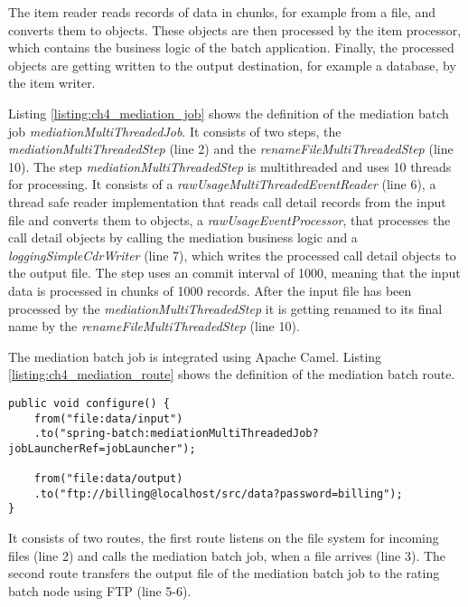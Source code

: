 The item reader reads records of data in chunks, for example from a file, and converts them to objects. These objects are then processed by the item processor, which contains the business logic of the batch application. Finally, the processed objects are getting written to the output destination, for example a database, by the item writer.



Listing \ref{listing:ch4_mediation_job} shows the definition of the mediation batch job \emph{mediationMultiThreadedJob}. It consists of two steps, the \emph{mediationMultiThreadedStep} (line 2) and the \emph{renameFileMultiThreadedStep} (line 10). The step \emph{mediationMultiThreadedStep} is multithreaded and uses 10 threads for processing. It consists of a \emph{rawUsageMultiThreadedEventReader} (line 6), a thread safe reader implementation that reads call detail records from the input file and converts them to objects, a \emph{rawUsageEventProcessor}, that processes the call detail objects by calling the mediation business logic and a \emph{loggingSimpleCdrWriter} (line 7), which writes the processed call detail objects to the output file. The step uses an commit interval of 1000, meaning that the input data is processed in chunks of 1000 records. After the input file has been processed by the \emph{mediationMultiThreadedStep} it is getting renamed to its final name by the \emph{renameFileMultiThreadedStep} (line 10).

The mediation batch job is integrated using Apache Camel. Listing \ref{listing:ch4_mediation_route} shows the definition of the mediation batch route.

\begin{lstlisting}[caption={Mediation batch route definition},label=listing:ch4_mediation_route]
public void configure() {
	from("file:data/input")
	.to("spring-batch:mediationMultiThreadedJob?jobLauncherRef=jobLauncher");
        
	from("file:data/output)
	.to("ftp://billing@localhost/src/data?password=billing");
}
\end{lstlisting}

It consists of two routes, the first route listens on the file system for incoming files (line 2) and calls the mediation batch job, when a file arrives (line 3). The second route transfers the output file of the mediation batch job to the rating batch node using \ac{FTP} (line 5-6).

